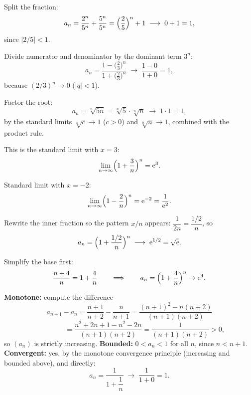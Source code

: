 \begin{solutions}
  \item Split the fraction:
        \[
          a_{n}=\frac{2^{n}}{5^{n}}+\frac{5^{n}}{5^{n}}
               =\Bigl(\frac{2}{5}\Bigr)^{n}+1
          \;\longrightarrow\;0+1=1 ,
        \]
        since $|2/5|<1$.

  \item Divide numerator and denominator by the dominant term $3^{n}$:
        \[
          a_{n}=\frac{1-\bigl(\tfrac{2}{3}\bigr)^{n}}
                     {1+\bigl(\tfrac{2}{3}\bigr)^{n}}
          \;\longrightarrow\;\frac{1-0}{1+0}=1 ,
        \]
        because $(2/3)^{n}\to 0$ ($|q|<1$).

  \item Factor the root:
        \[
          a_{n}=\sqrt[n]{5n}=\sqrt[n]{5}\cdot\sqrt[n]{n}
          \;\longrightarrow\;1\cdot 1=1 ,
        \]
        by the standard limits $\sqrt[n]{c}\to 1$ ($c>0$) and
        $\sqrt[n]{n}\to 1$, combined with the product rule.

  \item This is the standard limit with $x=3$:
        \[
          \lim_{n\to\infty}\Bigl(1+\frac{3}{n}\Bigr)^{n}=\mathrm{e}^{3} .
        \]

  \item Standard limit with $x=-2$:
        \[
          \lim_{n\to\infty}\Bigl(1-\frac{2}{n}\Bigr)^{n}
          =\mathrm{e}^{-2}=\frac{1}{\mathrm{e}^{2}} .
        \]

  \item Rewrite the inner fraction so the pattern $x/n$ appears:
        $\dfrac{1}{2n}=\dfrac{1/2}{n}$, so
        \[
          a_{n}=\Bigl(1+\frac{1/2}{n}\Bigr)^{n}
          \;\longrightarrow\;\mathrm{e}^{1/2}=\sqrt{\mathrm{e}} .
        \]

  \item Simplify the base first:
        \[
          \frac{n+4}{n}=1+\frac{4}{n}
          \qquad\Longrightarrow\qquad
          a_{n}=\Bigl(1+\frac{4}{n}\Bigr)^{n}\to\mathrm{e}^{4} .
        \]

  \item \textbf{Monotone:} compute the difference
        \[
          a_{n+1}-a_{n}=\frac{n+1}{n+2}-\frac{n}{n+1}
          =\frac{(n+1)^{2}-n(n+2)}{(n+1)(n+2)}
        \]
        \[
          \phantom{a_{n+1}-a_{n}}
          =\frac{n^{2}+2n+1-n^{2}-2n}{(n+1)(n+2)}
          =\frac{1}{(n+1)(n+2)}>0 ,
        \]
        so $(a_{n})$ is strictly increasing.
        \textbf{Bounded:} $0<a_{n}<1$ for all $n$, since $n<n+1$.
        \textbf{Convergent:} yes, by the monotone convergence principle
        (increasing and bounded above), and directly:
        \[
          a_{n}=\frac{1}{1+\dfrac{1}{n}}\;\longrightarrow\;\frac{1}{1+0}=1 .
        \]


\end{solutions}
